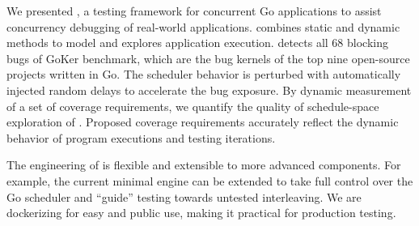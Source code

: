 We presented \goat, a testing framework for concurrent Go applications to assist concurrency debugging of real-world applications.
%
\goat combines static and dynamic methods to model and explores application execution.
%
\goat detects all 68 blocking bugs of GoKer benchmark, which are the bug kernels of the top nine open-source projects written in Go.
%
The scheduler behavior is perturbed with automatically injected random delays to accelerate the bug exposure.
%
By dynamic measurement of a set of coverage requirements, we quantify the quality of schedule-space exploration of \goat.
%
Proposed coverage requirements accurately reflect the dynamic behavior of program executions and testing iterations.

The engineering of \goat is flexible and extensible to more advanced components.
%
For example, the current minimal \goat engine can be extended to take full control over the Go scheduler and ``guide'' testing towards untested interleaving.
%
We are dockerizing \goat for easy and public use, making it practical for production testing.
